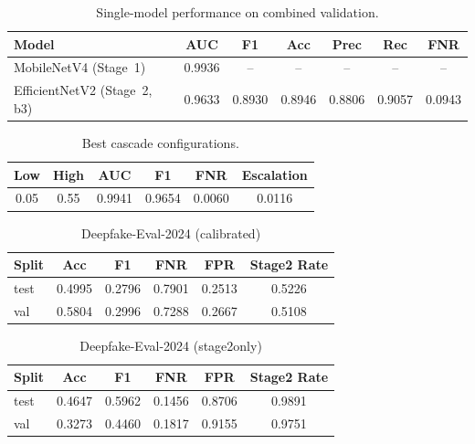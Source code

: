\begin{table}[h]
  \centering
  \caption{Single-model performance on combined validation.}\label{tab:single_models_auto}
  \begin{tabular}{lcccccc}\toprule
  Model & AUC & F1 & Acc & Prec & Rec & FNR \\ \midrule
  MobileNetV4 (Stage~1) & 0.9936 & -- & -- & -- & -- & -- \\ 
  EfficientNetV2 (Stage~2, b3) & 0.9633 & 0.8930 & 0.8946 & 0.8806 & 0.9057 & 0.0943 \\ 
  \bottomrule\end{tabular}\end{table}

\begin{table}[h]
  \centering
  \caption{Best cascade configurations.}\label{tab:cascade_best_auto}
  \begin{tabular}{cccccc}\toprule
 Low & High & AUC & F1 & FNR & Escalation \\ \midrule
  0.05 & 0.55 & 0.9941 & 0.9654 & 0.0060 & 0.0116 \\ 
  \bottomrule\end{tabular}\end{table}

\begin{table}[h]
  \centering
  \caption{Deepfake-Eval-2024 (calibrated)}\label{tab:deepeval_calibrated}
  \begin{tabular}{lccccc}\toprule
 Split & Acc & F1 & FNR & FPR & Stage2 Rate \\ \midrule
  test & 0.4995 & 0.2796 & 0.7901 & 0.2513 & 0.5226 \\ 
  val & 0.5804 & 0.2996 & 0.7288 & 0.2667 & 0.5108 \\ 
  \bottomrule\end{tabular}\end{table}

\begin{table}[h]
  \centering
  \caption{Deepfake-Eval-2024 (stage2only)}\label{tab:deepeval_stage2only}
  \begin{tabular}{lccccc}\toprule
 Split & Acc & F1 & FNR & FPR & Stage2 Rate \\ \midrule
  test & 0.4647 & 0.5962 & 0.1456 & 0.8706 & 0.9891 \\ 
  val & 0.3273 & 0.4460 & 0.1817 & 0.9155 & 0.9751 \\ 
  \bottomrule\end{tabular}\end{table}

